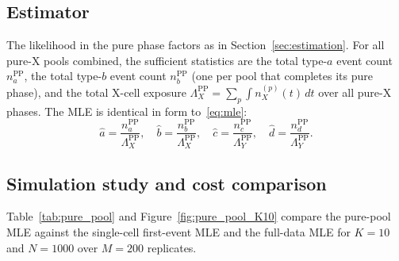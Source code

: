 \documentclass[12pt]{article}
\begin{document}
\subsection{Estimator}

The likelihood in the pure phase factors as in Section~\ref{sec:estimation}.
For all pure-X pools combined, the sufficient statistics are the total
type-$a$ event count $n_a^{\mathrm{PP}}$, the total type-$b$ event count
$n_b^{\mathrm{PP}}$ (one per pool that completes its pure phase), and the
total X-cell exposure $\Lambda_X^{\mathrm{PP}} = \sum_p \int n_X^{(p)}(t)\,dt$
over all pure-X phases.  The MLE is identical in form to~\eqref{eq:mle}:
\begin{equation}
  \hat{a} = \frac{n_a^{\mathrm{PP}}}{\Lambda_X^{\mathrm{PP}}},\quad
  \hat{b} = \frac{n_b^{\mathrm{PP}}}{\Lambda_X^{\mathrm{PP}}},\quad
  \hat{c} = \frac{n_c^{\mathrm{PP}}}{\Lambda_Y^{\mathrm{PP}}},\quad
  \hat{d} = \frac{n_d^{\mathrm{PP}}}{\Lambda_Y^{\mathrm{PP}}}.
  \label{eq:mle_pp}
\end{equation}

\subsection{Simulation study and cost comparison}

Table~\ref{tab:pure_pool} and Figure~\ref{fig:pure_pool_K10} compare the
pure-pool MLE against the single-cell first-event MLE and the full-data
MLE for $K = 10$ and $N = 1000$ over $M = 200$ replicates.
\end{document}
